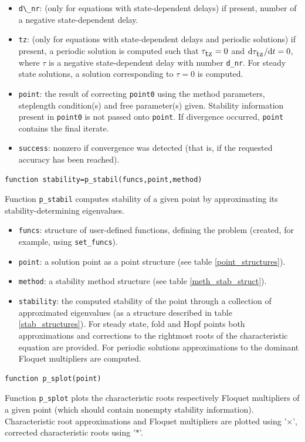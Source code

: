\documentclass[10pt]{scrartcl}
\renewcommand{\d}{\mathrm{d}}
\newcommand{\blist}[1]{\mbox{\lstinline!#1!}}
\begin{document}
{\begin{itemize}
  connecting orbits: if present and not empty, minimize phase shift
  with respect to this point. Note that this argument should always be
  present when correcting solutions for sd-DDEs, since in that case
  the argument \blist{d_nr} always needs to be specified.  In the case
  of steady state, fold or Hopf-like points, one can just enter an
  empty vector.
\item \blist{d\_nr}: (only for equations with state-dependent delays)
  if present, number of a negative state-dependent delay.
\item \blist{tz}: (only for equations with state-dependent delays and
  periodic solutions) if present, a periodic solution is computed such
  that $\tau_{\blist{tz}}=0$ and ${\d}\tau_{\blist{tz}}/{\d}t=0$, where
  $\tau$ is a negative state-dependent delay with number
  \blist{d_nr}. For steady state solutions, a solution corresponding
  to $\tau=0$ is computed.
\item \blist{point}: the result of correcting \blist{point0} using the
  method parameters, steplength condition(s) and free parameter(s)
  given. Stability information present in \blist{point0} is not passed
  onto \blist{point}.  If divergence occurred, \blist{point} contains
  the final iterate.
\item \blist{success}: nonzero if convergence was detected (that is,
  if the requested accuracy has been reached).
\end{itemize}
\begin{lstlisting}
function stability=p_stabil(funcs,point,method)  
\end{lstlisting}
\noindent Function \blist{p_stabil} computes stability of a given
point by approximating its stability-determining eigenvalues.
\begin{itemize}
\item \blist{funcs}: structure of user-defined functions, defining the
  problem (created, for example, using \blist{set_funcs}).
\item \blist{point}: a solution point as a point structure (see table
  \ref{point_structures}).
\item \blist{method}: a stability method structure (see table
  \ref{meth_stab_struct}).
\item \blist{stability}: the computed stability of the point through a
  collection of approximated eigenvalues (as a structure described in
  table \ref{stab_structures}).  For steady state, fold and Hopf
  points both approximations and corrections to the rightmost roots of
  the characteristic equation are provided.  For periodic solutions
  approximations to the dominant Floquet multipliers are computed.
\end{itemize}
\begin{lstlisting}
function p_splot(point)  
\end{lstlisting}
\noindent Function \blist{p_splot} plots the characteristic roots
respectively Floquet multipliers of a given point (which should
contain nonempty stability information).  Characteristic root
approximations and Floquet multipliers are plotted using '$\times$',
corrected characteristic roots using '$*$'.

}
\end{document}
